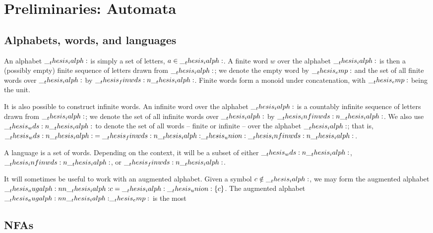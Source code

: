 \chapter{Preliminaries: Automata}\label{ch:automata}

\section{Alphabets, words, and languages}

An alphabet $\__thesis_ialph:$ is simply a set of letters, $a \in \__thesis_ialph:$.
A finite word $w$ over the alphabet $\__thesis_ialph:$ is then a (possibly empty) finite sequence of letters drawn from $\__thesis_ialph:$;
we denote the empty word by $\__thesis_emp:$ and the set of all finite words over $\__thesis_ialph:$ by $\__thesis_finwds:n {\__thesis_ialph:}$.
Finite words form a monoid under concatenation, with $\__thesis_emp:$ being the unit.

It is also possible to construct infinite words.
An infinite word over the alphabet $\__thesis_ialph:$ is a countably infinite sequence of letters drawn from $\__thesis_ialph:$;
we denote the set of all infinite words over $\__thesis_ialph:$ by $\__thesis_infinwds:n {\__thesis_ialph:}$.
We also use $\__thesis_wds:n {\__thesis_ialph:}$ to denote the set of all words -- finite or infinite -- over the alphabet $\__thesis_ialph:$; that is, $\__thesis_wds:n {\__thesis_ialph:} = \__thesis_finwds:n {\__thesis_ialph:} \__thesis_union: \__thesis_infinwds:n {\__thesis_ialph:}$.

A language is a set of words.
Depending on the context, it will be a subset of either $\__thesis_wds:n {\__thesis_ialph:}$, $\__thesis_infinwds:n {\__thesis_ialph:}$, or $\__thesis_finwds:n {\__thesis_ialph:}$.

It will sometimes be useful to work with an augmented alphabet.
Given a symbol $c \notin \__thesis_ialph:$, we may form the augmented alphabet $\__thesis_augalph:nn {\__thesis_ialph:} {c} = \__thesis_ialph: \__thesis_union: \{c\}$.
The augmented alphabet $\__thesis_augalph:nn {\__thesis_ialph:} {\__thesis_emp:}$ is the most

\section{\Aclp*{NFA}}

